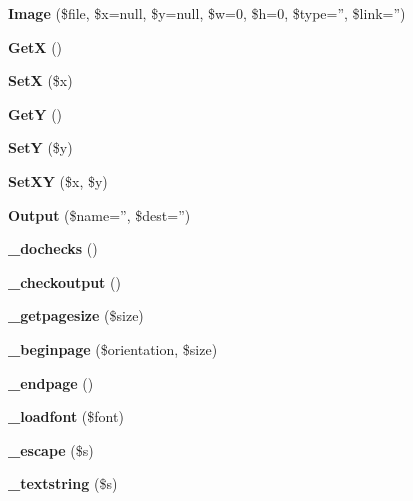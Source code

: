 \begin{DoxyCompactItemize}
\item 
{\bfseries Image} (\$file, \$x=null, \$y=null, \$w=0, \$h=0, \$type='', \$link='')\label{class_f_p_d_f_adfca5f603e68f92d5cf2d6b82b275597}

\item 
{\bfseries Get\+X} ()\label{class_f_p_d_f_a95399091cc57512472ac27cc258486fe}

\item 
{\bfseries Set\+X} (\$x)\label{class_f_p_d_f_a8794ca7726edaf339b07c400dbe4920a}

\item 
{\bfseries Get\+Y} ()\label{class_f_p_d_f_a6677aaf0484d3b84549d26cd7506b3ca}

\item 
{\bfseries Set\+Y} (\$y)\label{class_f_p_d_f_afaf7c0010d3e4c58b1865c63f2c7c500}

\item 
{\bfseries Set\+X\+Y} (\$x, \$y)\label{class_f_p_d_f_a321a64057625f46db2a6f67650fc7fa5}

\item 
{\bfseries Output} (\$name='', \$dest='')\label{class_f_p_d_f_aa774db9e49b78ed6743cd918c68bd4e6}

\item 
{\bfseries \+\_\+dochecks} ()\label{class_f_p_d_f_a9c05e5315160a62a4feb564def81701e}

\item 
{\bfseries \+\_\+checkoutput} ()\label{class_f_p_d_f_a142c29913cacdc9976cccd8d6e336adb}

\item 
{\bfseries \+\_\+getpagesize} (\$size)\label{class_f_p_d_f_aa12444ad763641b724c209d6941be147}

\item 
{\bfseries \+\_\+beginpage} (\$orientation, \$size)\label{class_f_p_d_f_a68fb6fa22bb023bdf504b953ff495b72}

\item 
{\bfseries \+\_\+endpage} ()\label{class_f_p_d_f_a852425b910fd9035535904ed622fc06a}

\item 
{\bfseries \+\_\+loadfont} (\$font)\label{class_f_p_d_f_a2216419f9e18dd21b019089fd57efb80}

\item 
{\bfseries \+\_\+escape} (\$s)\label{class_f_p_d_f_a927f66568983563cc588c62569fb73d6}

\item 
{\bfseries \+\_\+textstring} (\$s)\label{class_f_p_d_f_a6f4a715a6fc473c01f76ebb414eb75e5}


\end{DoxyCompactItemize}
